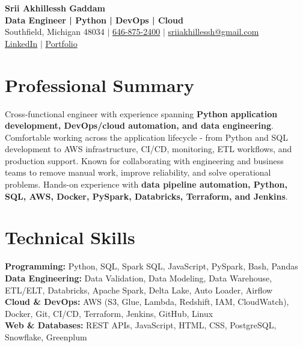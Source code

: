 \documentclass[letterpaper,10pt]{article}
\begin{document}
\fontsize{9.35pt}{10.45pt}\selectfont

\begin{center}
    {\LARGE \textbf{Srii Akhillessh Gaddam}} \\[-1pt]
    \textbf{Data Engineer | Python | DevOps | Cloud} \\[2pt]
    Southfield, Michigan 48034 $|$
    \href{tel:6468752400}{646-875-2400} $|$
    \href{mailto:sriiakhillessh@gmail.com}{sriiakhillessh@gmail.com} \\[1pt]
    \href{https://www.linkedin.com/in/srii-akhiilessh-gaddam-b48668191/}{LinkedIn} $|$
    \href{https://sriiakhillesshg.github.io/portfolio/}{Portfolio}
\end{center}
\vspace{-8pt}

\section{Professional Summary}
\small{Cross-functional engineer with experience spanning \textbf{Python application development, DevOps/cloud automation, and data engineering}. Comfortable working across the application lifecycle - from Python and SQL development to AWS infrastructure, CI/CD, monitoring, ETL workflows, and production support. Known for collaborating with engineering and business teams to remove manual work, improve reliability, and solve operational problems. Hands-on experience with \textbf{data pipeline automation, Python, SQL, AWS, Docker, PySpark, Databricks, Terraform, and Jenkins}.}

\section{Technical Skills}
\small{
\textbf{Programming:} Python, SQL, Spark SQL, JavaScript, PySpark, Bash, Pandas \\
\textbf{Data Engineering:} Data Validation, Data Modeling, Data Warehouse, ETL/ELT, Databricks, Apache Spark, Delta Lake, Auto Loader, Airflow \\
\textbf{Cloud \& DevOps:} AWS (S3, Glue, Lambda, Redshift, IAM, CloudWatch), Docker, Git, CI/CD, Terraform, Jenkins, GitHub, Linux \\
\textbf{Web \& Databases:} REST APIs, JavaScript, HTML, CSS, PostgreSQL, Snowflake, Greenplum
}
\end{document}
